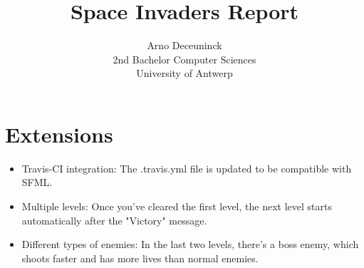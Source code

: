 \documentclass{article}
\title{Space Invaders Report}
\author{Arno Deceuninck\\ 2nd Bachelor Computer Sciences \\ University of Antwerp}
\begin{document}
	\maketitle

	\section{Extensions}
	\begin{itemize}
		\item Travis-CI integration: The .travis.yml file is updated to be compatible with SFML.
		\item Multiple levels: Once you've cleared the first level, the next level starts automatically after the "Victory" message.
		\item Different types of enemies: In the last two levels, there's a boss enemy, which shoots faster and has more lives than normal enemies.
	\end{itemize}
\end{document}
